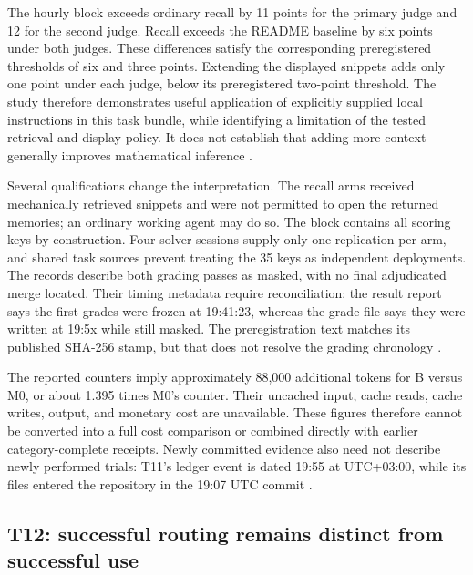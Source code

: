 The hourly block exceeds ordinary recall by 11 points for the primary judge and 12 for the second judge. Recall exceeds the README baseline by six points under both judges. These differences satisfy the corresponding preregistered thresholds of six and three points. Extending the displayed snippets adds only one point under each judge, below its preregistered two-point threshold. The study therefore demonstrates useful application of explicitly supplied local instructions in this task bundle, while identifying a limitation of the tested retrieval-and-display policy. It does not establish that adding more context generally improves mathematical inference \citep{benchmark_update_t11_prereg,benchmark_update_t11_result}.

Several qualifications change the interpretation. The recall arms received mechanically retrieved snippets and were not permitted to open the returned memories; an ordinary working agent may do so. The block contains all scoring keys by construction. Four solver sessions supply only one replication per arm, and shared task sources prevent treating the 35 keys as independent deployments. The records describe both grading passes as masked, with no final adjudicated merge located. Their timing metadata require reconciliation: the result report says the first grades were frozen at 19:41:23, whereas the grade file says they were written at 19:5x while still masked. The preregistration text matches its published SHA-256 stamp, but that does not resolve the grading chronology \citep{benchmark_update_t11_result,benchmark_update_t11_grades,benchmark_update_t11_stamp}.

The reported counters imply approximately 88,000 additional tokens for B versus M0, or about 1.395 times M0's counter. Their uncached input, cache reads, cache writes, output, and monetary cost are unavailable. These figures therefore cannot be converted into a full cost comparison or combined directly with earlier category-complete receipts. Newly committed evidence also need not describe newly performed trials: T11's ledger event is dated 19:55 at UTC+03:00, while its files entered the repository in the 19:07 UTC commit \citep{benchmark_update_t11_result,benchmark_update_round6_landed}.

\subsection{T12: successful routing remains distinct from successful use}
\label{sec:t12-update}

